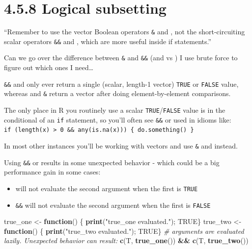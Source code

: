 \documentclass[]{book}
\newenvironment{Shaded}{\begin{snugshade}}{\end{snugshade}}
\newcommand{\CommentTok}[1]{\textcolor[rgb]{0.56,0.35,0.01}{\textit{#1}}}
\newcommand{\ControlFlowTok}[1]{\textcolor[rgb]{0.13,0.29,0.53}{\textbf{#1}}}
\newcommand{\KeywordTok}[1]{\textcolor[rgb]{0.13,0.29,0.53}{\textbf{#1}}}
\newcommand{\NormalTok}[1]{#1}
\newcommand{\OperatorTok}[1]{\textcolor[rgb]{0.81,0.36,0.00}{\textbf{#1}}}
\newcommand{\OtherTok}[1]{\textcolor[rgb]{0.56,0.35,0.01}{#1}}
\newcommand{\StringTok}[1]{\textcolor[rgb]{0.31,0.60,0.02}{#1}}
\providecommand{\tightlist}{%
  \setlength{\itemsep}{0pt}\setlength{\parskip}{0pt}}
\begin{document}
\hypertarget{logical-subsetting}{%
\section*{4.5.8 Logical subsetting}\label{logical-subsetting}}

``Remember to use the vector Boolean operators \texttt{\&} and \texttt{\textbar{}}, not the short-circuiting scalar operators \texttt{\&\&} and \texttt{\textbar{}\textbar{}}, which are more useful inside if statements.''

Can we go over the difference between \texttt{\&} and \texttt{\&\&} (and \texttt{\textbar{}} vs \texttt{\textbar{}\textbar{}}) I use brute force to figure out which ones I need\ldots{}

\texttt{\&\&} and \texttt{\textbar{}\textbar{}} only ever return a single (scalar, length-1 vector) \texttt{TRUE} or \texttt{FALSE} value, whereas \texttt{\textbar{}} and \texttt{\&} return a vector after doing element-by-element comparisons.

The only place in R you routinely use a scalar \texttt{TRUE}/\texttt{FALSE} value is in the conditional of an \texttt{if} statement, so you'll often see \texttt{\&\&} or \texttt{\textbar{}\textbar{}} used in idioms like: \texttt{if\ (length(x)\ \textgreater{}\ 0\ \&\&\ any(is.na(x)))\ \{\ do.something()\ \}}

In most other instances you'll be working with vectors and use \texttt{\&} and \texttt{\textbar{}} instead.

Using \texttt{\&\&} or \texttt{\textbar{}\textbar{}} results in some unexpected behavior - which could be a big performance gain in some cases:

\begin{itemize}
\tightlist
\item
  \texttt{\textbar{}\textbar{}} will not evaluate the second argument when the first is \texttt{TRUE}
\item
  \texttt{\&\&} will not evaluate the second argument when the first is \texttt{FALSE}
\end{itemize}

\begin{Shaded}
\begin{Highlighting}[]
\NormalTok{true_one <-}\StringTok{ }\ControlFlowTok{function}\NormalTok{() \{ }\KeywordTok{print}\NormalTok{(}\StringTok{"true_one evaluated."}\NormalTok{); }\OtherTok{TRUE}\NormalTok{\}}
\NormalTok{true_two <-}\StringTok{ }\ControlFlowTok{function}\NormalTok{() \{ }\KeywordTok{print}\NormalTok{(}\StringTok{"true_two evaluated."}\NormalTok{); }\OtherTok{TRUE}\NormalTok{\}}
\CommentTok{# arguments are evaluated lazily.  Unexpected behavior can result:}
\KeywordTok{c}\NormalTok{(T, }\KeywordTok{true_one}\NormalTok{()) }\OperatorTok{&&}\StringTok{ }\KeywordTok{c}\NormalTok{(T, }\KeywordTok{true_two}\NormalTok{())}
\end{Highlighting}
\end{Shaded}
\end{document}
